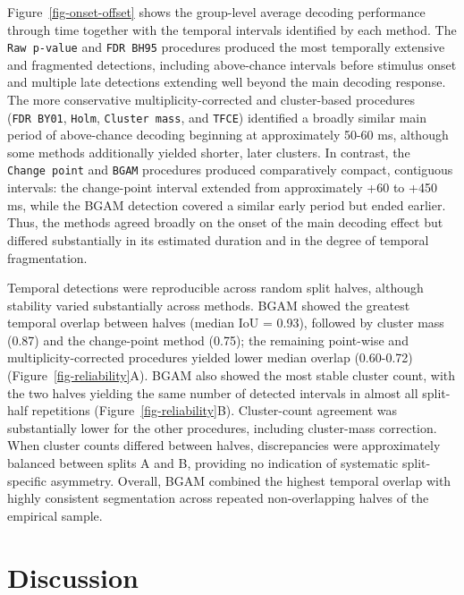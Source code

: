 \documentclass[
  doc,
  floatsintext,
  longtable,
  a4paper,
  nolmodern,
  notxfonts,
  notimes,
  colorlinks=true,linkcolor=blue,citecolor=blue,urlcolor=blue]{apa7}
\begin{document}
Figure~\ref{fig-onset-offset} shows the group-level average decoding
performance through time together with the temporal intervals identified
by each method. The \texttt{Raw\ p-value} and \texttt{FDR\ BH95}
procedures produced the most temporally extensive and fragmented
detections, including above-chance intervals before stimulus onset and
multiple late detections extending well beyond the main decoding
response. The more conservative multiplicity-corrected and cluster-based
procedures (\texttt{FDR\ BY01}, \texttt{Holm}, \texttt{Cluster\ mass},
and \texttt{TFCE}) identified a broadly similar main period of
above-chance decoding beginning at approximately 50-60 ms, although some
methods additionally yielded shorter, later clusters. In contrast, the
\texttt{Change\ point} and \texttt{BGAM} procedures produced
comparatively compact, contiguous intervals: the change-point interval
extended from approximately +60 to +450 ms, while the BGAM detection
covered a similar early period but ended earlier. Thus, the methods
agreed broadly on the onset of the main decoding effect but differed
substantially in its estimated duration and in the degree of temporal
fragmentation.

Temporal detections were reproducible across random split halves,
although stability varied substantially across methods. BGAM showed the
greatest temporal overlap between halves (median IoU = 0.93), followed
by cluster mass (0.87) and the change-point method (0.75); the remaining
point-wise and multiplicity-corrected procedures yielded lower median
overlap (0.60-0.72) (Figure~\ref{fig-reliability}A). BGAM also showed
the most stable cluster count, with the two halves yielding the same
number of detected intervals in almost all split-half repetitions
(Figure~\ref{fig-reliability}B). Cluster-count agreement was
substantially lower for the other procedures, including cluster-mass
correction. When cluster counts differed between halves, discrepancies
were approximately balanced between splits A and B, providing no
indication of systematic split-specific asymmetry. Overall, BGAM
combined the highest temporal overlap with highly consistent
segmentation across repeated non-overlapping halves of the empirical
sample.

\FloatBarrier

\section{Discussion}\label{discussion}
\end{document}

